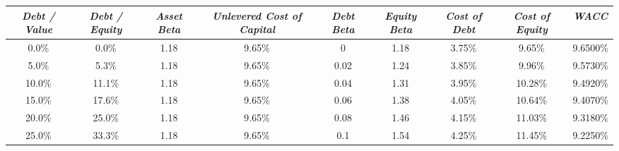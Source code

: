 \documentclass{article}
\begin{document}
\begin{enumerate}
	\begin{table}[ht]
	\tiny
	\centering
	\begin{tabular}{@{}ccccccccc@{}}
	\toprule
	\textit{Debt / Value} & \textit{Debt / Equity} & \textit{Asset Beta} & \textit{Unlevered Cost of Capital} & \textit{Debt Beta} & \textit{Equity Beta} & \textit{Cost of Debt} & \textit{Cost of Equity} & \textit{WACC} \\ \midrule
	0.0\%                 & 0.0\%                  & 1.18                & 9.65\%                             & 0                  & 1.18                 & 3.75\%                & 9.65\%                  & 9.6500\%      \\
	5.0\%                 & 5.3\%                  & 1.18                & 9.65\%                             & 0.02               & 1.24                 & 3.85\%                & 9.96\%                  & 9.5730\%      \\
	10.0\%                & 11.1\%                 & 1.18                & 9.65\%                             & 0.04               & 1.31                 & 3.95\%                & 10.28\%                 & 9.4920\%      \\
	15.0\%                & 17.6\%                 & 1.18                & 9.65\%                             & 0.06               & 1.38                 & 4.05\%                & 10.64\%                 & 9.4070\%      \\
	20.0\%                & 25.0\%                 & 1.18                & 9.65\%                             & 0.08               & 1.46                 & 4.15\%                & 11.03\%                 & 9.3180\%      \\
	25.0\%                & 33.3\%                 & 1.18                & 9.65\%                             & 0.1                & 1.54                 & 4.25\%                & 11.45\%                 & 9.2250\%      \\ \bottomrule
	\end{tabular}
	\end{table}
	\end{enumerate}
	
\end{document}
